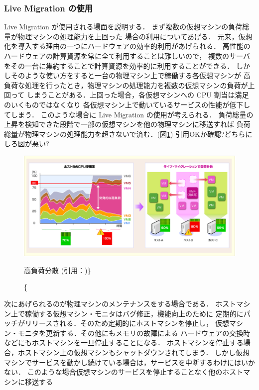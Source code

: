 \documentclass[graduation-thesis]{mlarticle}
\begin{document}
\subsubsection{Live Migration の使用}
\label{sec-2-3-2}
Live Migration が使用される場面を説明する．
まず複数の仮想マシンの負荷総量が物理マシンの処理能力を上回った
場合の利用についてあげる．
元来，仮想化を導入する理由の一つにハードウェアの効率的利用があげられる．
高性能のハードウェアの計算資源を常に全て利用することは難しいので，
複数のサーバをその一台に集約することで計算資源を効率的に利用することができる．
しかしそのような使い方をすると一台の物理マシン上で稼働する各仮想マシンが
高負荷な処理を行ったとき，物理マシンの処理能力を複数の仮想マシンの負荷が上回って
しまうことがある．上回った場合，各仮想マシンへの CPU 割当は満足のいくものではなくなり
各仮想マシン上で動いているサービスの性能が低下してしまう．
このような場合に Live Migration の使用が考えられる．
負荷総量の上昇を検知できた段階で一部の仮想マシンを他の物理マシンに移送すれば
負荷総量が物理マシンの処理能力を超さないで済む．(図\ref{high_load})
引用OKか確認?どちらにしろ図が悪い?
\begin{figure}[H]\begin{center}\includegraphics[width=16.0cm]{./img/high_load.png}\caption\{ 高負荷分散 (引用：\cite{livemigration})\}\label{high_load}\end{center}\end{figure}
次にあげられるのが物理マシンのメンテナンスをする場合である．
ホストマシン上で稼働する仮想マシン・モニタはバグ修正，機能向上のために
定期的にパッチがリリースされる．そのため定期的にホストマシンを停止し，
仮想マシン・モニタを更新する．その他にもメモリの故障による
ハードウェアの交換時などにもホストマシンを一旦停止することになる．
ホストマシンを停止する場合，ホストマシン上の仮想マシンもシャットダウンされてしまう．
しかし仮想マシンでサービスを動かし続けている場合は，サービスを中断するわけにはいかない．
このような場合仮想マシンのサービスを停止することなく他のホストマシンに移送する
\end{document}
